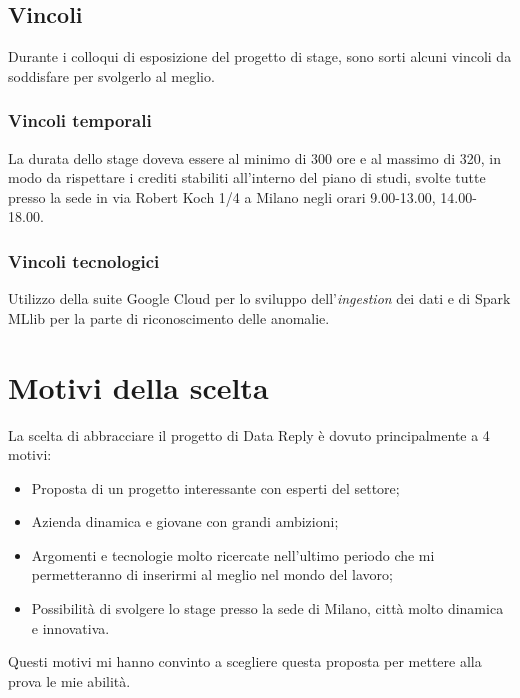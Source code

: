 \subsection{Vincoli}
Durante i colloqui di esposizione del progetto di stage, sono sorti alcuni vincoli da soddisfare per svolgerlo al meglio.
\subsubsection{Vincoli temporali}
La durata dello stage doveva essere al minimo di 300 ore e al massimo di 320, in modo da rispettare i crediti stabiliti all'interno del piano di studi, svolte tutte presso la sede in via Robert Koch 1/4 a Milano negli orari 9.00-13.00, 14.00-18.00.
\subsubsection{Vincoli tecnologici}
Utilizzo della suite Google Cloud per lo sviluppo dell'\emph{ingestion} dei dati e di Spark MLlib per la parte di riconoscimento delle anomalie.
\section{Motivi della scelta}
La scelta di abbracciare il progetto di Data Reply è dovuto principalmente a 4 motivi:
\begin{itemize}
	\item Proposta di un progetto interessante con esperti del settore;
	\item Azienda dinamica e giovane con grandi ambizioni;
	\item Argomenti e tecnologie molto ricercate nell'ultimo periodo che mi permetteranno di inserirmi al meglio nel mondo del lavoro;
	\item Possibilità di svolgere lo stage presso la sede di Milano, città molto dinamica e innovativa.
\end{itemize}
Questi motivi mi hanno convinto a scegliere questa proposta per mettere alla prova le mie abilità.

